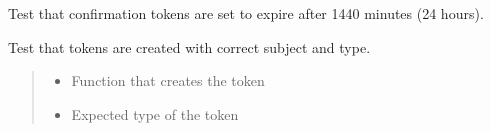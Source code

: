 \documentclass[letterpaper,10pt,openany,oneside,english]{sphinxmanual}
\begin{document}
\begin{savenotes}\begin{fulllineitems}
\label{\detokenize{modules/tests:storeapi.tests.test_security.test_confirm_token_expire_minutes}}
\pysigstartsignatures
{}
\pysigstopsignatures
\sphinxAtStartPar
Test that confirmation tokens are set to expire after 1440 minutes (24 hours).

\end{fulllineitems}\end{savenotes}


\begin{savenotes}\begin{fulllineitems}
\label{\detokenize{modules/tests:storeapi.tests.test_security.test_create_token}}
\pysigstartsignatures
{}
\pysigstopsignatures
\sphinxAtStartPar
Test that tokens are created with correct subject and type.
\begin{quote}\begin{description}
\begin{itemize}
\item {} 
\sphinxAtStartPar
{} \textendash{} Function that creates the token

\item {} 
\sphinxAtStartPar
{} \textendash{} Expected type of the token

\end{itemize}

\end{description}\end{quote}

\end{fulllineitems}\end{savenotes}

\end{document}
